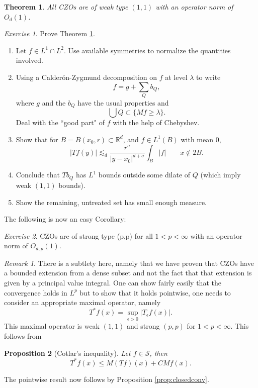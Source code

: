 \documentclass[11pt]{article}
\newtheorem{thm}{Theorem}
\newtheorem{prop}[thm]{Proposition}
\theoremstyle{remark}
\newtheorem{exr}{Exercise}
\newtheorem*{rmk}{Remark}
\newcommand{\calS}{\mathcal{S}}
\newcommand{\1}{\textbf{1}}
\newcommand{\lle}{\lesssim}
\newcommand{\bbR}{\mathbb{R}}
\begin{document}
\begin{thm}
All CZOs are of weak type $(1,1)$ with an operator norm of $O_d(1)$.
\label{thm:w11}
\end{thm}
\begin{exr}
Prove Theorem \ref{thm:w11}.
\begin{enumerate}
\item[(1)] Let $f \in L^1 \cap L^2$. Use available symmetries to normalize the quantities involved.
\item[(2)] Using a Calder\'on-Zygmund decomposition on $f$ at level $\lambda$ to write
\[
f = g + \sum_Q b_Q,
\]
where $g$ and the $b_Q$ have the usual properties and
\[
\bigcup Q \subset \{Mf \geq \lambda \}.
\]
Deal with the ``good  part" of $f$ with the help of Chebyshev.
\item[(3)] Show that for $B = B(x_0,r) \subset \bbR^d$, and $f \in L^1(B)$ with mean $0$,
\[
|Tf(y)| \lle_d \frac{r^\sigma}{|y-x_0|^{d+\sigma}} \int_B|f|\qquad x \not\in 2B.
\] 
\item[(4)] Conclude that $Tb_Q$ has $L^1$ bounds outside some dilate of $Q$ (which imply weak $(1,1)$ bounds).
\item[(5)] Show the remaining, untreated set has small enough measure.
\end{enumerate}
\end{exr}
The following is now an easy Corollary:
\begin{exr}
CZOs are of strong type (p,p) for all $1 < p < \infty$ with an operator norm of $O_{d,p}(1)$.
\label{ex:czobds}
\end{exr}
\begin{rmk}
There is a subtlety here, namely that we have proven that CZOs have a bounded extension from a dense subset and not the fact that that extension is given by a principal value integral. One can show fairly easily that the convergence holds in $L^p$ but to show that it holds pointwise, one needs to consider an appropriate maximal operator, namely
\[
T^* f(x) = \sup_{\epsilon > 0} |T_\epsilon f(x)|.
\]
This maximal operator is weak $(1,1)$ and strong $(p,p)$ for $1 < p < \infty$. This follows from
\begin{prop}[Cotlar's inequality]
Let $f \in \calS$, then 
\[
T^*f(x) \leq M(Tf)(x) + C Mf(x).
\]
\end{prop}
The pointwise result now follows by Proposition \ref{prop:closedconv}.
\end{rmk}
\end{document}
